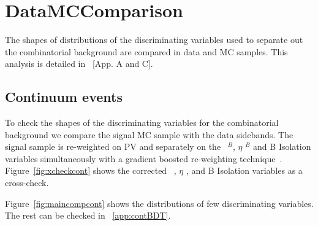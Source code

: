 \section{DataMCComparison}
\label{sec:DataMCComparison}

The shapes of distributions of the discriminating variables used to separate
out the combinatorial background are compared in data and MC samples.
This analysis is detailed in~\cite{bsmumuv2} [App. A and C].
   
\subsection{Continuum events}
\label{sec:compcont}
  
To check the shapes of the discriminating variables for the
combinatorial background we compare the signal MC sample with
the data sidebands. The signal sample is re-weighted on PV and separately on the \pt\ $^B$, $\eta$ $^B$ and B Isolation
variables simultaneously with a gradient boosted re-weighting technique~\cite{Rogozhnikov:2016bdp}.
Figure~\ref{fig:xcheckcont} shows the corrected \pt\ , $\eta$ ,  and B Isolation variables as a cross-check.
  
Figure~\ref{fig:maincompcont} shows the distributions of few
discriminating variables. The rest can be checked in
~\ref{app:contBDT}.
  
